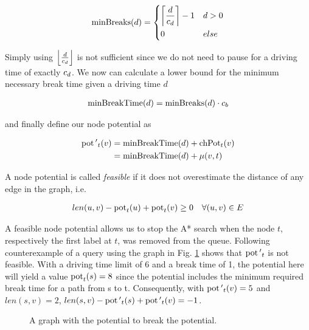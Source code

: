 \begin{align}\label{eq:min_breaks}
	\minBreaks(d) = \begin{dcases}
		\ceil*{ \frac{d}{\restr_d} } - 1 & d > 0 \\
		0                                & else
	\end{dcases}
\end{align}

Simply using $\floor*{ \frac{d}{\restr_d} }$ is not sufficient since we do not need to pause for a driving time of exactly $\restr_d$. We now can calculate a lower bound for the minimum necessary break time given a driving time $d$

\begin{align}\label{eq:min_break_time}
	\minBreakTime(d) = \minBreaks(d) \cdot \restr_b
\end{align}

and finally define our node potential as

\begin{align}
	\concretepotential{'}_t(v) & = \minBreakTime(d) + \chpotential_t(v) \\
	                           & = \minBreakTime(d) + \distance(v,t)
\end{align}

A node potential is called \emph{feasible} if it does not overestimate the distance of any edge in the graph, i.e.

\begin{align}
	\label{eq:node_potential_feasibility}
	len(u,v) - \concretepotential_t(u) + \concretepotential_t(v) \ge 0 \quad \forall (u,v) \in E
\end{align}

A feasible node potential allows us to stop the A* search when the node $t$, respectively the first label at $t$, was removed from the queue. Following counterexample of a query using the graph in Fig. \ref{fig:graph_infeasible_potential} shows that $\concretepotential{'}_t$ is not feasible. With a driving time limit of 6 and a break time of 1, the potential here will yield a value $\concretepotential_t(s) = 8$ since the potential includes the minimum required break time for a path from s to t. Consequently, with $\concretepotential{'}_t(v) = 5$ and $len(s,v) = 2$, $len(s,v) - \concretepotential{'}_t(s) + \concretepotential{'}_t(v) = -1$.

\begin{figure}[hbtp]
	\centering
	
	\caption{A graph with the potential to break the potential.}
	\label{fig:graph_infeasible_potential}
\end{figure}

